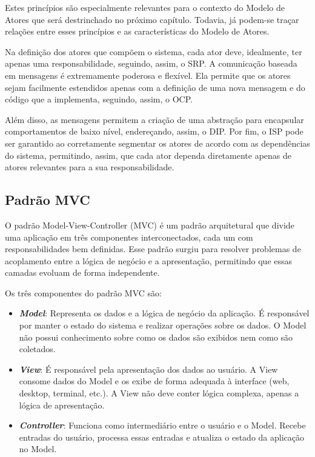 Estes princípios são especialmente relevantes para o contexto do Modelo de Atores que será destrinchado no próximo capítulo. Todavia, já podem-se traçar relações entre esses princípios e as características do Modelo de Atores. 

Na definição dos atores que compõem o sistema, cada ator deve, idealmente, ter apenas uma responsabilidade, seguindo, assim, o SRP. A comunicação baseada em mensagens é extremamente poderosa e flexível. Ela permite que os atores sejam facilmente estendidos apenas com a definição de uma nova mensagem e do código que a implementa, seguindo, assim, o OCP. 

Além disso, as mensagens permitem a criação de uma abstração para encapsular comportamentos de baixo nível, endereçando, assim, o DIP. Por fim, o ISP pode ser garantido ao corretamente segmentar os atores de acordo com as dependências do sistema, permitindo, assim, que cada ator dependa diretamente apenas de atores relevantes para a sua responsabilidade.


\subsection{Padrão MVC}

O padrão Model-View-Controller (MVC) \citep{reenskaug1979mvc} é um padrão arquitetural que divide uma aplicação em três componentes interconectados, cada um com responsabilidades bem definidas. Esse padrão surgiu para resolver problemas de acoplamento entre a lógica de negócio e a apresentação, permitindo que essas camadas evoluam de forma independente.

Os três componentes do padrão MVC são:
\begin{itemize}
    \item \textit{\textbf{Model}}: Representa os dados e a lógica de negócio da aplicação. É responsável por manter o estado do sistema e realizar operações sobre os dados. O Model não possui conhecimento sobre como os dados são exibidos nem como são coletados.
    
    \item \textit{\textbf{View}}: É responsável pela apresentação dos dados ao usuário. A View consome dados do Model e os exibe de forma adequada à interface (web, desktop, terminal, etc.). A View não deve conter lógica complexa, apenas a lógica de apresentação.
    
    \item \textit{\textbf{Controller}}: Funciona como intermediário entre o usuário e o Model. Recebe entradas do usuário, processa essas entradas e atualiza o estado da aplicação no Model.
\end{itemize}

